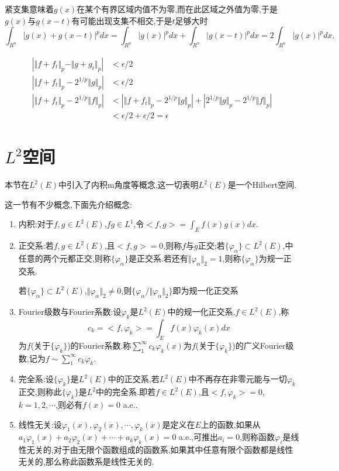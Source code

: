 \documentclass[12pt,a4paper,openany]{book}
\begin{document}
\begin{enumerate}
紧支集意味着$g(x)$在某个有界区域内值不为零,而在此区域之外值为零,于是$g(x)$与$g(x-t)$有可能出现支集不相交,于是$t$足够大时
\[
\int_{R^n}{|g(x)+g(x-t)|^pdx}=\int_{R^n}{|g(x)|^pdx}+\int_{R^n}{|g(x-t)|^pdx}=2\int_{R^n}{|g(x)|^pdx}.
\]

\[
\begin{aligned}
|\Vert{f + f_t}\Vert_p - \Vert{g + g_t}\Vert_p|&<\epsilon/2 \\
|\Vert{f + f_t}\Vert_p - 2^{1/p}\Vert{g}\Vert_p|&<\epsilon/2 \\
|\Vert{f + f_t}\Vert_p - 2^{1/p}\Vert{f}\Vert_p| &< |\Vert{f+f_t}\Vert_p-2^{1/p}\Vert{g}\Vert_p| + |2^{1/p}\Vert{g}\Vert_p - 2^{1/p}\Vert{f}\Vert_p| \\
&< \epsilon/2 + \epsilon/2=\epsilon
\end{aligned}
\]
\end{enumerate}

\section{$L^2$空间}
本节在$L^2(E)$中引入了内积m角度等概念,这一切表明$L^2(E)$是一个Hilbert空间.

这一节有不少概念,下面先介绍概念:

\begin{enumerate}
\item 内积:对于$f,g \in L^2(E)$,$fg \in L^1$,令$<f,g>=\int_{E}{f(x)g(x)dx}$.

\item 正交系:若$f,g \in L^2(E)$,且$<f,g>=0$,则称$f$与$g$正交;若$\{\varphi_{\alpha}\} \subset L^2(E)$,中任意的两个元都正交,则称$\{\varphi_{\alpha}\}$是正交系.若还有$\Vert{\varphi_{\alpha}}\Vert_2=1$,则称$\{\varphi_{\alpha}\}$为规一正交系.

若$\{\varphi_{\alpha}\} \subset L^2(E)$,$\Vert{\varphi_{\alpha}}\Vert_2 \neq 0$,则$\{\varphi_{\alpha}/\Vert{\varphi_{\alpha}}\Vert_2\}$即为规一化正交系

\item Fourier级数与Fourier系数:设$\varphi_k$是$L^2(E)$中的规一化正交系,$f \in L^2(E)$,称
\[
c_k=<f, \varphi_k>=\int_{E}{f(x)\varphi_k(x)dx}
\]
为$f$(关于$\{\varphi_k\}$)的Fourier系数.称$\sum_{1}^{\infty}{c_k\varphi_k(x)}$为$f$(关于$\{\varphi_k\}$)的广义Fourier级数,记为$f \sim \sum_{1}^{\infty}{c_k\varphi_k}$.

\item 完全系:设$\{\varphi_k\}$是$L^2(E)$中的正交系,若$L^2(E)$中不再存在非零元能与一切$\varphi_k$正交,则称此$\{\varphi_k\}$是$L^2$中的完全系.即若$f \in L^2(E)$,且$<f, \varphi_k>=0$,$k=1,2,\cdots$,则必有$f(x)=0$ a.e..

\item 线性无关:设$\varphi_1(x),\varphi_2(x),\cdots, \varphi_k(x)$是定义在$E$上的函数,如果从$a_1\varphi_1(x)+a_2\varphi_2(x)+\cdots+a_k\varphi_k(x)=0$ a.e.,可推出$a_i=0$,则称函数$\varphi_i$是线性无关的,对于由无限个函数组成的函数系,如果其中任意有限个函数都是线性无关的,那么称此函数系是线性无关的.
\end{enumerate}
\end{document}
